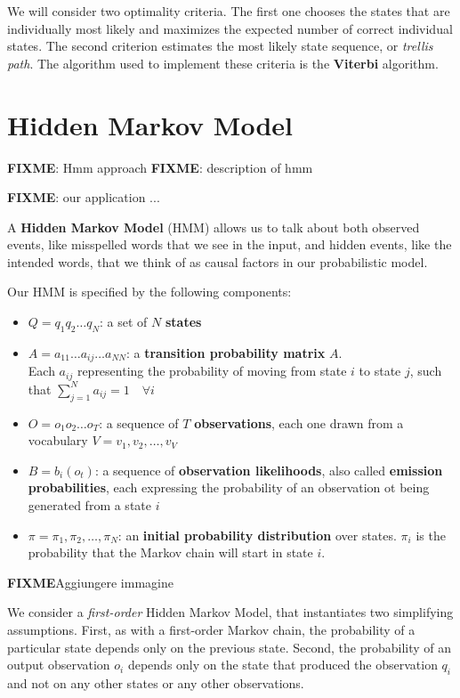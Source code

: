 We will consider two optimality criteria. The first one chooses the states that are individually most likely and maximizes the 
expected number of correct individual states. The second criterion estimates the most likely state sequence, or 
\textit{trellis path}. The algorithm used to implement these criteria is the \textbf{Viterbi} algorithm. %

\section{Hidden Markov Model}

\textbf{FIXME}: Hmm approach
\textbf{FIXME}: description of hmm

\textbf{FIXME}: our application ...

A \textbf{Hidden Markov Model} (HMM) allows us to talk about both observed events, like misspelled words that we see in 
the input, and hidden events, like the intended words, that we think of as causal factors in our probabilistic model. 

Our HMM is specified by the following components:
\begin{itemize}
	\item $Q = q_1q_2 \dots q_N$: a set of $N$ \textbf{states}
	\item $A=a_{11}	\dots a_{ij} \dots a_{NN}$: a \textbf{transition probability matrix} $A$. \\ Each $a_{ij}$ representing 
	the probability of moving from state $i$ to state $j$, such that $\sum_{j=1}^N a_{ij}=1 \quad \forall i$
	\item $O = o_1o_2 \dots o_T$: a sequence of $T$ \textbf{observations}, each one drawn from a vocabulary $V = 
	v_1,v_2,\dots,v_V$
	\item $B = b_i (o_t )$: a sequence of \textbf{observation likelihoods}, also called \textbf{emission probabilities}, each 
	expressing the probability of an observation ot being generated from a state $i$
	\item $\pi = \pi_1,\pi_2,\dots,\pi_N$: an \textbf{initial probability distribution} over states. $\pi_i$ is the probability 
	that the Markov chain will start in state $i$. 
\end{itemize}

\textbf{FIXME}{Aggiungere immagine }

We consider a \textit{first-order} Hidden Markov Model, that instantiates two simplifying assumptions. First, as with a 
first-order Markov chain, the probability of a particular state depends only on the previous state. Second, the probability 
of an output observation $o_i$ depends only on the state that produced the observation $q_i$ and not on any other states 
or any other observations.


